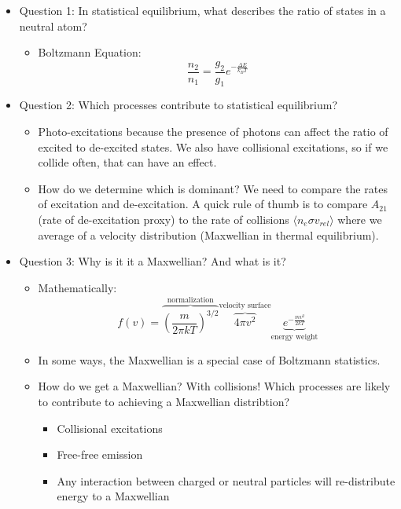 \documentclass{article}
\begin{document}
\begin{itemize}
    \item Question 1: In statistical equilibrium, what describes the ratio of states in a neutral atom?
    \begin{itemize}
        \item Boltzmann Equation:
        \begin{equation}
            \frac{n_2}{n_1} = \frac{g_2}{g_1} e^{-\frac{\Delta E}{k_B T}}
        \end{equation}
    \end{itemize}
    \item Question 2: Which processes contribute to statistical equilibrium? 
    \begin{itemize}
        \item Photo-excitations because the presence of photons can affect the ratio of excited to de-excited states. We also have collisional excitations, so if we collide often, that can have an effect. 
        \item How do we determine which is dominant? We need to compare the rates of excitation and de-excitation. A quick rule of thumb is to compare $A_{21}$ (rate of de-excitation proxy) to the rate of collisions $\langle n_{e} \sigma v_{rel} \rangle$ where we average of a velocity distribution (Maxwellian in thermal equilibrium). 
    \end{itemize}
    \item Question 3: Why is it it a Maxwellian? And what is it?
    \begin{itemize}
        \item Mathematically:
        \begin{equation}
            f(v) = \overbrace{\left(\frac{m}{2\pi k T}\right)^{3/2}}^\text{normalization} \overbrace{4 \pi v^2}^\text{velocity surface} \underbrace{e^{-\frac{m v^2}{2 k T}}}_\text{energy weight}
        \end{equation}
        \item In some ways, the Maxwellian is a special case of Boltzmann statistics. 
        \item How do we get a Maxwellian? With collisions! Which processes are likely to contribute to achieving a Maxwellian distribtion?
        \begin{itemize}
            \item Collisional excitations
            \item Free-free emission
            \item Any interaction between charged or neutral particles will re-distribute energy to a Maxwellian

\end{itemize}
\end{itemize}
\end{itemize}
\end{document}

